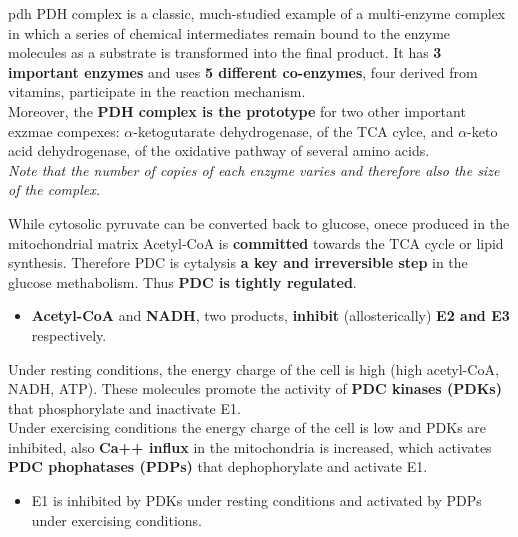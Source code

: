 \documentclass[../main.tex]{subfiles}
\begin{document}
\begin{RemarkWithTitel}{\gls{pdh}}
	PDH complex is a classic, much-studied example of a multi-enzyme complex in which a series of chemical intermediates remain bound to the enzyme molecules as a substrate is transformed into the final product. It has \textbf{3 important enzymes} and uses \textbf{5 different co-enzymes}, four derived from vitamins, participate in the reaction mechanism. \\ 
	Moreover, the \textbf{PDH complex is the prototype} for two other important exzmae compexes: $\alpha$-ketogutarate dehydrogenase, of the TCA cylce, and $\alpha$-keto acid dehydrogenase, of the oxidative pathway of several amino acids. \\
	\textit{Note that the number of copies of each enzyme varies and therefore also the size of the complex. } 
\end{RemarkWithTitel}
\noindent 
While cytosolic pyruvate can be converted back to glucose, onece produced in the mitochondrial matrix Acetyl-CoA is \textbf{committed} towards the TCA cycle or lipid synthesis. Therefore PDC is cytalysis \textbf{a key and irreversible step} in the glucose methabolism. Thus \textbf{PDC is tightly regulated}. 
\begin{itemize}
	\item \textbf{Acetyl-CoA} and \textbf{NADH}, two products, \textbf{inhibit} (allosterically) \textbf{E2 and E3} respectively. 
\end{itemize}
\noindent 
Under resting conditions, the energy charge of the cell is high (high acetyl-CoA, NADH, ATP). These molecules promote the activity of \textbf{PDC kinases (PDKs)} that phosphorylate and inactivate E1. \\
Under exercising conditions the energy charge of the cell is low and PDKs are inhibited, also \textbf{Ca++ influx} in the mitochondria is increased, which activates \textbf{PDC phophatases (PDPs)} that dephophorylate and activate E1. 
\begin{itemize}
	\item E1 is inhibited by PDKs under resting conditions and activated by PDPs under exercising conditions.  
\end{itemize}
\end{document}
